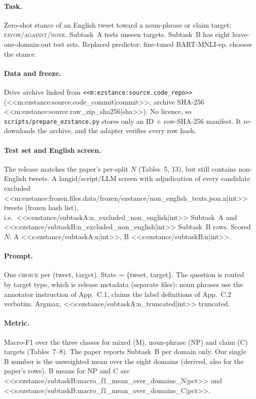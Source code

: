 \paragraph{Task.} Zero-shot stance of an English tweet toward a noun-phrase or claim target:
\textsc{favor}/\textsc{against}/\textsc{none}. Subtask~A tests unseen targets. Subtask~B has eight
leave-one-domain-out test sets. Replaced predictor: fine-tuned BART-MNLI-ep. \jev{} chooses the stance.

\paragraph{Data and freeze.} Drive archive linked from \texttt{<<m:ezstance:source.code_repo>>}
(<<m:ezstance:source.code_commit|commit>>, archive SHA-256 <<m:ezstance:source.raw_zip_sha256|sha>>). No licence, so
\texttt{scripts/prepare\_ezstance.py} stores only an ID + row-SHA-256 manifest. It re-downloads the archive, and
the adapter verifies every row hash.

\paragraph{Test set and English screen.} The release matches the paper's per-split $N$ (Tables~5, 13), but still
contains non-English tweets. A langid/script/LLM screen with adjudication of every candidate excluded
<<m:ezstance:frozen.files.data/frozen/ezstance/non_english_texts.json.n|int>> tweets (frozen hash list), i.e.\
<<s:ezstance/subtaskA:n_excluded_non_english|int>> Subtask~A and <<s:ezstance/subtaskB:n_excluded_non_english|int>>
Subtask~B rows. Scored $N$: A <<s:ezstance/subtaskA:n|int>>, B <<s:ezstance/subtaskB:n|int>>.

\paragraph{Prompt.} One \textsc{choice} per (tweet, target). State = \{tweet, target\}. The question is routed by
target type, which is release metadata (separate files): noun phrases use the annotator instruction of App.~C.1,
claims the label definitions of App.~C.2 verbatim. Argmax, <<s:ezstance/subtaskA:n_truncated|int>> truncated.

\paragraph{Metric.} Macro-F1 over the three classes for mixed (M), noun-phrase (NP) and claim (C) targets
(Tables~7--8). The paper reports Subtask~B per domain only. Our single B number is the unweighted mean over the eight
domains (derived, also for the paper's rows). B means for NP and C are
<<s:ezstance/subtaskB:macro_f1_mean_over_domains_N|pct>> and <<s:ezstance/subtaskB:macro_f1_mean_over_domains_C|pct>>.

